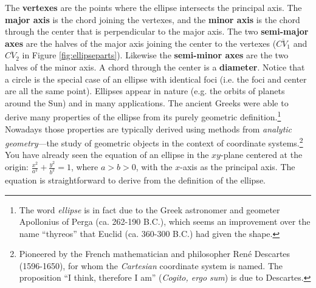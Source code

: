 The \textbf{vertexes} are the points where the ellipse
intersects the principal axis. The \textbf{major axis}
is the chord joining the vertexes, and the \textbf{minor axis} is the chord
through the center that is perpendicular to the major axis. The two \textbf{semi-major axes} are the
halves of the major axis joining the center to the vertexes ($\overline{CV_1}$
and $\overline{CV_2}$ in Figure \ref{fig:ellipseparts}). Likewise the
\textbf{semi-minor axes} are the two halves of
the minor axis. A chord through the center is a
\textbf{diameter}. Notice that a circle is the special
case of an ellipse with identical foci (i.e. the foci and center are all the
same point).
\newpage
Ellipses appear in nature (e.g. the orbits of planets around the Sun) and in
many applications.
The ancient Greeks were able to derive many properties of the ellipse from its
purely geometric definition.\footnote{The word \emph{ellipse} is in fact due to
the Greek astronomer and geometer Apollonius of Perga (ca. 262-190 B.C.), which
seems an improvement over the name ``thyreos'' that Euclid (ca. 360-300 B.C.)
had given the shape.} Nowadays those properties are typically derived
using methods from \emph{analytic geometry}---the study of geometric objects in
the context of coordinate systems.\footnote{Pioneered by the French
mathematician and philosopher Ren\'{e} Descartes (1596-1650), for whom the
\emph{Cartesian} coordinate system is named. The proposition ``I think,
therefore I am'' (\emph{Cogito, ergo sum}) is due to Descartes.} 
You have already seen the equation of an ellipse in the $xy$-plane centered at
the origin: $\frac{x^2}{a^2} + \frac{y^2}{b^2} = 1$, where $a>b>0$, with the
$x$-axis as the principal axis. The equation is straightforward to derive from
the definition of the ellipse.

